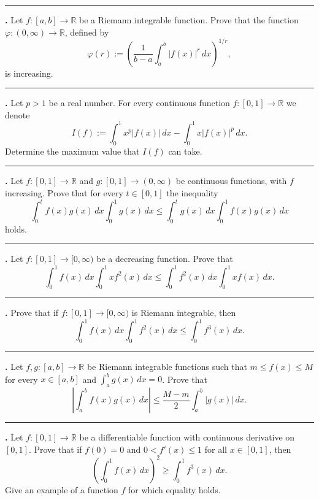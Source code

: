 \documentclass[11pt]{article}
\newcounter{probnum}
\newenvironment{problembox}{\par\noindent\rule{\linewidth}{0.5pt}\vspace{5pt}\par}{\vspace{2pt}}
\begin{document}
\begin{problembox}
\textbf{\theprobnum.} Let $f : [a,b] \to \mathbb{R}$ be a Riemann integrable function. Prove that the function $\varphi : (0,\infty) \to \mathbb{R}$, defined by
\[
\varphi(r) := \left(\frac{1}{b-a} \int_a^b |f(x)|^r\,dx\right)^{1/r},
\]
is increasing.
\end{problembox}

\begin{problembox}
\textbf{\theprobnum.} Let $p > 1$ be a real number. For every continuous function $f : [0,1] \to \mathbb{R}$ we denote
\[
I(f) := \int_0^1 x^p |f(x)|\,dx - \int_0^1 x |f(x)|^p\,dx.
\]
Determine the maximum value that $I(f)$ can take.
\end{problembox}

\begin{problembox}
\textbf{\theprobnum.} Let $f : [0,1] \to \mathbb{R}$ and $g : [0,1] \to (0,\infty)$ be continuous functions, with $f$ increasing. Prove that for every $t \in [0,1]$ the inequality
\[
\int_0^t f(x) g(x)\,dx \int_0^1 g(x)\,dx \le \int_0^t g(x)\,dx \int_0^1 f(x) g(x)\,dx
\]
holds.
\end{problembox}

\begin{problembox}
\textbf{\theprobnum.} Let $f : [0,1] \to [0,\infty)$ be a decreasing function. Prove that
\[
\int_0^1 f(x)\,dx \int_0^1 x f^2(x)\,dx \le \int_0^1 f^2(x)\,dx \int_0^1 x f(x)\,dx.
\]
\end{problembox}

\begin{problembox}
\textbf{\theprobnum.} Prove that if $f : [0,1] \to [0,\infty)$ is Riemann integrable, then
\[
\int_0^1 f(x)\,dx \int_0^1 f^2(x)\,dx \le \int_0^1 f^3(x)\,dx.
\]
\end{problembox}

\begin{problembox}
\textbf{\theprobnum.} Let $f, g : [a,b] \to \mathbb{R}$ be Riemann integrable functions such that $m \le f(x) \le M$ for every $x \in [a,b]$ and $\displaystyle\int_a^b g(x)\,dx = 0$. Prove that
\[
\left|\int_a^b f(x) g(x)\,dx\right| \le \frac{M-m}{2} \int_a^b |g(x)|\,dx.
\]
\end{problembox}

\begin{problembox}
\textbf{\theprobnum.} Let $f : [0,1] \to \mathbb{R}$ be a differentiable function with continuous derivative on $[0,1]$. Prove that if $f(0)=0$ and $0 < f'(x) \le 1$ for all $x \in [0,1]$, then
\[
\left(\int_0^1 f(x)\,dx\right)^2 \ge \int_0^1 f^3(x)\,dx.
\]
Give an example of a function $f$ for which equality holds.
\end{problembox}
\end{document}
